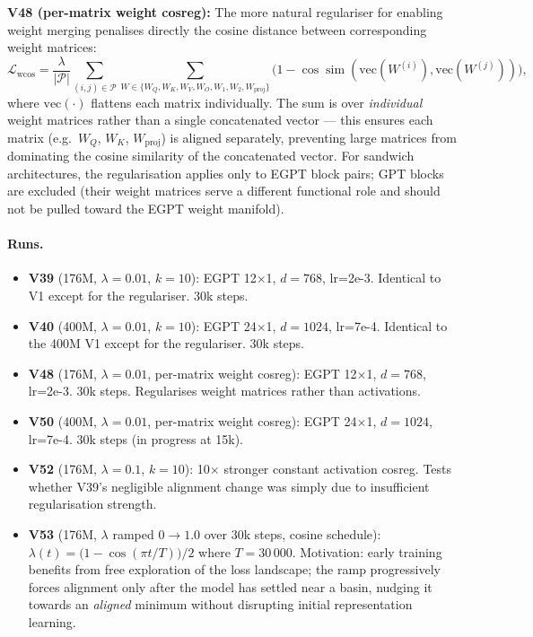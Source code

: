 \textbf{V48 (per-matrix weight cosreg):}
The more natural regulariser for enabling weight merging penalises directly the cosine distance
between corresponding weight matrices:
\begin{equation}
  \mathcal{L}_{\mathrm{wcos}} = \frac{\lambda}{|\mathcal{P}|} \sum_{(i,j)\in\mathcal{P}}
      \sum_{W \in \{W_Q, W_K, W_V, W_O, W_1, W_2, W_\mathrm{proj}\}}
      \bigl(1 - \cos\!\operatorname{sim}(\mathrm{vec}(W^{(i)}), \mathrm{vec}(W^{(j)}))\bigr) ,
\end{equation}
where $\mathrm{vec}(\cdot)$ flattens each matrix individually.
The sum is over \emph{individual} weight matrices rather than a single concatenated vector ---
this ensures each matrix (e.g.\ $W_Q$, $W_K$, $W_\mathrm{proj}$) is aligned separately,
preventing large matrices from dominating the cosine similarity of the concatenated vector.
For sandwich architectures, the regularisation applies only to EGPT block pairs; GPT blocks
are excluded (their weight matrices serve a different functional role and should not be
pulled toward the EGPT weight manifold).

\paragraph{Runs.}
\begin{itemize}
  \item \textbf{V39} (176M, $\lambda{=}0.01$, $k{=}10$): EGPT 12$\times$1, $d{=}768$, lr=2e-3.
        Identical to V1 except for the regulariser.  30k steps.
  \item \textbf{V40} (400M, $\lambda{=}0.01$, $k{=}10$): EGPT 24$\times$1, $d{=}1024$, lr=7e-4.
        Identical to the 400M V1 except for the regulariser.  30k steps.
  \item \textbf{V48} (176M, $\lambda{=}0.01$, per-matrix weight cosreg):
        EGPT 12$\times$1, $d{=}768$, lr=2e-3.  30k steps.  Regularises weight matrices
        rather than activations.
  \item \textbf{V50} (400M, $\lambda{=}0.01$, per-matrix weight cosreg):
        EGPT 24$\times$1, $d{=}1024$, lr=7e-4.  30k steps (in progress at 15k).
  \item \textbf{V52} (176M, $\lambda{=}0.1$, $k{=}10$): 10$\times$ stronger constant activation cosreg.
        Tests whether V39's negligible alignment change was simply due to insufficient regularisation strength.
  \item \textbf{V53} (176M, $\lambda$ ramped $0{\to}1.0$ over 30k steps, cosine schedule):
        $\lambda(t) = \bigl(1 - \cos(\pi t / T)\bigr)/2$ where $T{=}30\,000$.
        Motivation: early training benefits from free exploration of the loss landscape;
        the ramp progressively forces alignment only after the model has settled near
        a basin, nudging it towards an \emph{aligned} minimum without disrupting
        initial representation learning.
\end{itemize}


